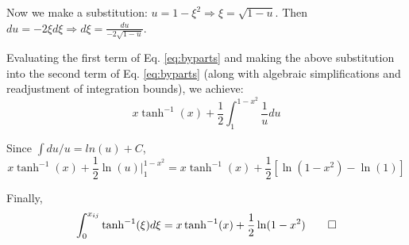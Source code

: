 \documentclass[11pt,letterpaper]{article}
\theoremstyle{definition}
\begin{document}
Now we make a substitution: $u = 1-\xi^2 \Rightarrow \xi = \sqrt{1 - u}$. Then $du = -2\xi d\xi \Rightarrow d\xi = \frac{du}{-2\sqrt{1-u}}$. 

Evaluating the first term of Eq. \ref{eq:byparts} and making the above substitution into the second term of Eq. \ref{eq:byparts} (along with algebraic simplifications and readjustment of integration bounds), we achieve:
\[
x \tanh^{-1}(x)  + \frac{1}{2} \int_1^{1-x^2} \frac{1}{u} du
\]

Since $\int du / u = ln(u) + C$, 
\[
x \tanh^{-1}(x)  + \frac{1}{2} \ln(u) \bigg\rvert_1^{1-x^2} = x \tanh^{-1}(x)  + \frac{1}{2} \left[ \ln(1-x^2) - \ln(1) \right]
\]

Finally,
\[
\int_0^{x_{ij}} \tanh^{-1}(\xi) d \xi = x \tanh^{-1}(x)  + \frac{1}{2} \ln ( 1 - x^2) 
\qed
\]
\end{document}
